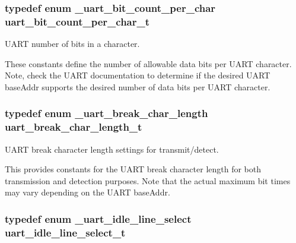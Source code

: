 \subsubsection[{\texorpdfstring{uart\+\_\+bit\+\_\+count\+\_\+per\+\_\+char\+\_\+t}{uart_bit_count_per_char_t}}]{\setlength{\rightskip}{0pt plus 5cm}typedef enum {\bf \+\_\+uart\+\_\+bit\+\_\+count\+\_\+per\+\_\+char}  {\bf uart\+\_\+bit\+\_\+count\+\_\+per\+\_\+char\+\_\+t}}\hypertarget{group__uart__hal_gac4809775c7544386cbc25fcd06f695a2}{}\label{group__uart__hal_gac4809775c7544386cbc25fcd06f695a2}


U\+A\+RT number of bits in a character. 

These constants define the number of allowable data bits per U\+A\+RT character. Note, check the U\+A\+RT documentation to determine if the desired U\+A\+RT base\+Addr supports the desired number of data bits per U\+A\+RT character. 
\subsubsection[{\texorpdfstring{uart\+\_\+break\+\_\+char\+\_\+length\+\_\+t}{uart_break_char_length_t}}]{\setlength{\rightskip}{0pt plus 5cm}typedef enum {\bf \+\_\+uart\+\_\+break\+\_\+char\+\_\+length}  {\bf uart\+\_\+break\+\_\+char\+\_\+length\+\_\+t}}\hypertarget{group__uart__hal_ga8a5d7a3ed1043bb5a67f1b5d3e9d6453}{}\label{group__uart__hal_ga8a5d7a3ed1043bb5a67f1b5d3e9d6453}


U\+A\+RT break character length settings for transmit/detect. 

This provides constants for the U\+A\+RT break character length for both transmission and detection purposes. Note that the actual maximum bit times may vary depending on the U\+A\+RT base\+Addr. 
\subsubsection[{\texorpdfstring{uart\+\_\+idle\+\_\+line\+\_\+select\+\_\+t}{uart_idle_line_select_t}}]{\setlength{\rightskip}{0pt plus 5cm}typedef enum {\bf \+\_\+uart\+\_\+idle\+\_\+line\+\_\+select}  {\bf uart\+\_\+idle\+\_\+line\+\_\+select\+\_\+t}}\hypertarget{group__uart__hal_ga9082a7f856054fd3a754ec115f91ac6b}{}\label{group__uart__hal_ga9082a7f856054fd3a754ec115f91ac6b}


